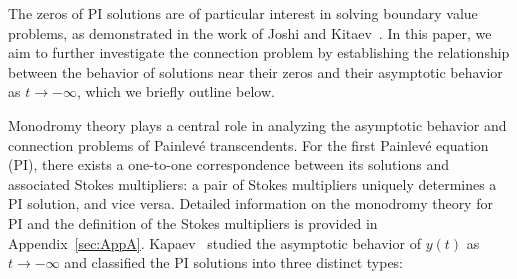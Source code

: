 \documentclass[12pt]{article}
\theoremstyle{plain}
\theoremstyle{definition}
\numberwithin{equation}{section}
\begin{document}
The zeros of PI solutions are of particular interest in solving boundary value problems, as demonstrated in the work of Joshi and Kitaev~\cite{Joshi-Kitaev-2005}. In this paper, we aim to further investigate the connection problem by establishing the relationship between the behavior of solutions near their zeros and their asymptotic behavior as $t \to -\infty$, which we briefly outline below.

\medskip

Monodromy theory plays a central role in analyzing the asymptotic behavior and connection problems of Painlev\'e transcendents. For the first Painlev\'e equation (PI), there exists a one-to-one correspondence between its solutions and associated Stokes multipliers: a pair of Stokes multipliers uniquely determines a PI solution, and vice versa. Detailed information on the monodromy theory for PI and the definition of the Stokes multipliers is provided in Appendix~\ref{sec:AppA}. Kapaev~\cite{AAKapaev-1988} studied the asymptotic behavior of $y(t)$ as $t \to -\infty$ and classified the PI solutions into three distinct types:
\end{document}
